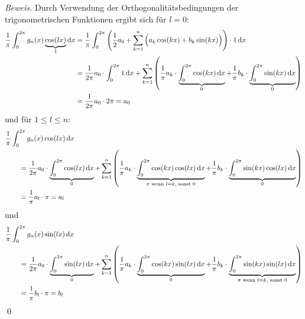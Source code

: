 \textit{Beweis.} Durch Verwendung der Orthogonalitätsbedingungen der trigonometrischen Funktionen
%
ergibt sich für $l=0$:
%
\begin{align*}
  \dfrac{1}{\pi} \int_{0}^{2\pi} g_n(x)\underbrace{\cos(lx)}_{1} \mathop{}\!\mathrm{d} x 
  &= \dfrac{1}{\pi} \int_{0}^{2\pi} \left(\dfrac{1}{2}a_0 + \sum_{k=1}^{n}\Big(a_k\cos(kx)+b_k\sin(kx)\Big)\right)\cdot 1 \mathop{}\!\mathrm{d} x \\
  &= \dfrac{1}{2\pi} a_0\cdot \int_{0}^{2\pi} 1 \mathop{}\!\mathrm{d} x
  + \sum_{k=1}^n \left(
    \dfrac{1}{\pi} a_k \cdot\underbrace{\int_{0}^{2\pi} \cos(kx) \mathop{}\!\mathrm{d} x}_{0} 
    + \dfrac{1}{\pi} b_k \cdot \underbrace{\int_{0}^{2\pi} \sin(kx)\mathop{}\!\mathrm{d} x}_{0}
  \right) \\
  &= \dfrac{1}{2\pi} a_0 \cdot 2\pi = a_0
\end{align*}
%
und für $1\leq l \leq n$:
\begin{align*}
  &\dfrac{1}{\pi} \int_{0}^{2\pi} g_n(x)\cos(lx) \mathop{}\!\mathrm{d} x \\
  &\qquad= \dfrac{1}{2\pi} a_0 \cdot\underbrace{\int_{0}^{2\pi} \cos(lx) \mathop{}\!\mathrm{d} x}_{0}
  + \sum_{k=1}^n \left(
    \dfrac{1}{\pi}a_k\cdot\underbrace{\int_{0}^{2\pi} \cos(kx)\cos(lx) \mathop{}\!\mathrm{d} x}_{\pi\text{ wenn } l=k, \text{ sonst } 0}
    + \dfrac{1}{\pi} b_k\cdot\underbrace{\int_{0}^{2\pi} \sin(kx)\cos(lx)\mathop{}\!\mathrm{d} x}_{0}
  \right) \\
  &\qquad= \dfrac{1}{\pi} a_l \cdot \pi = a_l
\end{align*}
und 
\begin{align*}
  &\dfrac{1}{\pi} \int_{0}^{2\pi} g_n(x)\sin(lx) \mathop{}\!\mathrm{d} x \\
  &\qquad= \dfrac{1}{2\pi} a_0\cdot \underbrace{\int_{0}^{2\pi} \sin(lx) \mathop{}\!\mathrm{d} x}_{0}
  + \sum_{k=1}^n \left(
    \dfrac{1}{\pi}a_k\cdot\underbrace{\int_{0}^{2\pi} \cos(kx)\sin(lx) \mathop{}\!\mathrm{d} x}_{0}
    + \dfrac{1}{\pi} b_k\cdot\underbrace{\int_{0}^{2\pi} \sin(kx)\sin(lx)\mathop{}\!\mathrm{d} x}_{\pi\text{ wenn } l=k, \text{ sonst } 0}
  \right) \\
  &\qquad= \dfrac{1}{\pi} b_l \cdot \pi = b_l
\end{align*}
\qed
%

